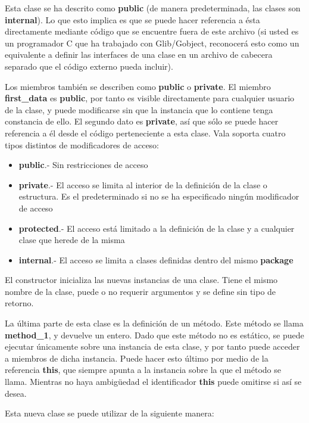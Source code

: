 \documentclass[12pt,twoside]{book}
\begin{document}
Esta clase se ha descrito como \textbf{public} (de manera predeterminada, las clases son \textbf{internal}). Lo que esto implica es que se puede hacer referencia a ésta directamente mediante código que se encuentre fuera de este archivo (si usted es un programador C que ha trabajado con Glib/Gobject, reconocerá esto como un equivalente a definir las interfaces de una clase en un archivo de cabecera separado que el código externo pueda incluir).

Los miembros también se describen como \textbf{public} o \textbf{private}. El miembro \textbf{first\_data} es \textbf{public}, por tanto es visible directamente para cualquier usuario de la clase, y puede modificarse sin que la instancia que lo contiene tenga constancia de ello. El segundo dato es \textbf{private}, así que sólo se puede hacer referencia a él desde el código perteneciente a esta clase. Vala soporta cuatro tipos distintos de modificadores de acceso:

\begin{itemize}
	\item \textbf{public}.- Sin restricciones de acceso
	\item \textbf{private}.- El acceso se limita al interior de la definición de la clase o estructura. Es el predeterminado si no se ha especificado ningún modificador de acceso
	\item \textbf{protected}.- El acceso está limitado a la definición de la clase y a cualquier clase que herede de la misma
	\item \textbf{internal}.- El acceso se limita a clases definidas dentro del mismo \textbf{package}
\end{itemize}

El constructor inicializa las nuevas instancias de una clase. Tiene el mismo nombre de la clase, puede o no requerir argumentos y se define sin tipo de retorno.

La última parte de esta clase es la definición de un método. Este método se llama \textbf{method\_1}, y devuelve un entero. Dado que este método no es estático, se puede ejecutar únicamente sobre una instancia de esta clase, y por tanto puede acceder a miembros de dicha instancia. Puede hacer esto último por medio de la referencia \textbf{this}, que siempre apunta a la instancia sobre la que el método se llama. Mientras no haya ambigüedad el identificador \textbf{this} puede omitirse si así se desea.

Esta nueva clase se puede utilizar de la siguiente manera:
\end{document}
